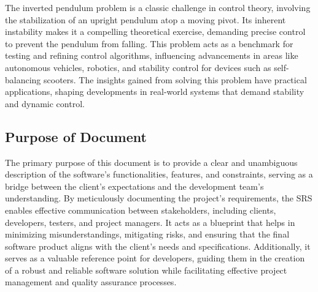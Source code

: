 \documentclass[12pt]{article}
\begin{document}
The inverted pendulum problem is a classic challenge in control theory,
involving the stabilization of an upright pendulum atop a moving pivot.
Its inherent instability makes it a compelling theoretical exercise,
demanding precise control to prevent the pendulum from falling.
This problem acts as a benchmark for testing and refining control algorithms,
influencing advancements in areas like autonomous vehicles, robotics,
and stability control for devices such as self-balancing scooters.
The insights gained from solving this problem have practical applications,
shaping developments in real-world systems that demand stability
and dynamic control.


\subsection{Purpose of Document}


The primary purpose of this document is to provide a clear and unambiguous
description of the software's functionalities, features, and constraints,
serving as a bridge between the client's expectations and 
the development team's understanding. By meticulously documenting 
the project's requirements, the SRS enables effective communication 
between stakeholders, including clients, developers, testers, 
and project managers. It acts as a blueprint that helps 
in minimizing misunderstandings, mitigating risks, and ensuring 
that the final software product aligns with the client's needs 
and specifications. Additionally, it serves as a valuable 
reference point for developers, guiding them in the creation 
of a robust and reliable software solution while facilitating 
effective project management and quality assurance processes.
\end{document}
